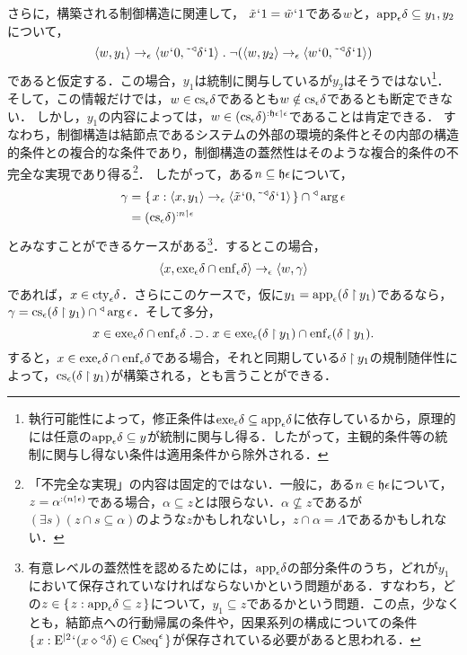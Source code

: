 さらに，構築される制御構造に関連して，
$ \tilde{x}{\mspace{1mu}{`}\mspace{1mu}} 1 = \tilde{w}{\mspace{1mu}{`}\mspace{1mu}} 1 $である$w$と，$ \mathrm{app}_{\epsilon}\delta\subseteq y_1,y_2 $について，
\[
    \orp{w,y_1}\to_{\epsilon}\orp{w\fap 0,\tildel{\trgl{\delta}}\fap 1}\con{1}\neg(\orp{w,y_2}\to_{\epsilon}\orp{w\fap 0,\tildel{\trgl{\delta}}\fap 1})
\]
であると仮定する．この場合，$y_1$は統制に関与しているが$y_2$はそうではない\footnote{
    執行可能性によって，修正条件は$ \mathrm{exe}_{\epsilon}\delta\subseteq\mathrm{app}_{\epsilon}\delta $に依存しているから，原理的には任意の$ \mathrm{app}_{\epsilon}\delta\subseteq y $が統制に関与し得る．したがって，主観的条件等の統制に関与し得ない条件は適用条件から除外される．}．
そして，この情報だけでは，$ w\in\mathrm{cs}_{\epsilon}\delta $であるとも$ w\notin\mathrm{cs}_{\epsilon}\delta $であるとも断定できない．
しかし，$ y_1 $の内容によっては，$ w\in (\mathrm{cs}_{\epsilon}\delta)^{:\mathfrak{h}\epsilon\mathbin{\upharpoonleft}\epsilon} $であることは肯定できる．
すなわち，制御構造は結節点であるシステムの外部の環境的条件とその内部の構造的条件との複合的な条件であり，制御構造の蓋然性はそのような複合的条件の不完全な実現であり得る\footnote{
    「不完全な実現」の内容は固定的ではない．一般に，ある$n\in\mathfrak{h}\epsilon$について，$ z = \alpha^{:(n\mathbin{\upharpoonleft}\epsilon)} $である場合，$\alpha\subseteq z$とは限らない．$\alpha\nsubseteq z$であるが$(\exists s)(z\cap s\subseteq\alpha)$のような$z$かもしれないし，$ z\cap\alpha = \Lambda $であるかもしれない．
}．
したがって，ある$n\subseteq\mathfrak{h}\epsilon$について，
\begin{align*}
    \gamma & = \{\mspace{2mu}x:\langle x,y_1 \rangle\to_{\epsilon}\langle \tilde{x}{\mspace{1mu}{`}\mspace{1mu}} 0,\tilde{\:\:}{^\triangleleft}\delta{\mspace{1mu}{`}\mspace{1mu}} 1 \rangle\mspace{2mu}\}\cap{^\triangleleft}\arg\epsilon\\ & = (\mathrm{cs}_{\epsilon}\delta)^{:n\mathbin{\upharpoonleft}\epsilon}
\end{align*}
とみなすことができるケースがある\footnote{
    有意レベルの蓋然性を認めるためには，$ \mathrm{app}_{\epsilon}\delta $の部分条件のうち，どれが$y_1$において保存されていなければならないかという問題がある．すなわち，どの$ z\in\{\mspace{2mu}z:\mathrm{app}_{\epsilon}\delta\subseteq z\mspace{2mu}\} $について，$ y_1\subseteq z $であるかという問題．この点，少なくとも，結節点への行動帰属の条件や，因果系列の構成についての条件$ \{\mspace{2mu}x:\mathrm{E}^{\mid 2}{\mspace{1mu}{`}\mspace{1mu}}(x\diamond{^\triangleleft}\delta)\in\mathrm{Cseq}^\epsilon\mspace{2mu}\} $が保存されている必要があると思われる．
}．するとこの場合，
\begin{align*}
    \langle x,\mathrm{exe}_{\epsilon}\delta\cap\mathrm{enf}_{\epsilon}\delta \rangle\to_{\epsilon}\langle w,\gamma \rangle
\end{align*}
であれば，$ x\in\mathrm{cty}_{\epsilon}\delta $．さらにこのケースで，仮に$ y_1 = \mathrm{app}_{\epsilon}{(\delta\mathbin{\upharpoonright} y_1)} $であるなら，$ \gamma = \mathrm{cs}_{\epsilon}(\delta\mathbin{\upharpoonright} y_1)\cap {^\triangleleft}\arg\epsilon $．そして多分，
\[
    x\in \exe{\epsilon}\delta\cap\enf{\epsilon}\delta\case{1}{1}{1}x\in \exe{\epsilon}(\delta\uphr y_1)\cap\enf{\epsilon}(\delta\uphr y_1).
\]
すると，$ x\in \mathrm{exe}_{\epsilon}\delta\cap\mathrm{enf}_{\epsilon}\delta $である場合，それと同期している$ \delta\mathbin{\upharpoonright} y_1 $の規制随伴性によって，$ \mathrm{cs}_{\epsilon}(\delta\mathbin{\upharpoonright} y_1) $が構築される，とも言うことができる．

